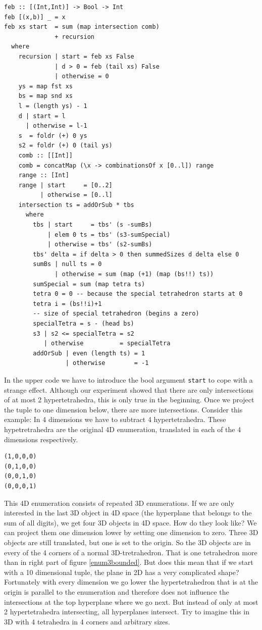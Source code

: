 \documentclass{tmr}
\begin{document}
\begin{Verbatim}
feb :: [(Int,Int)] -> Bool -> Int
feb [(x,b)] _ = x
feb xs start  = sum (map intersection comb)
              + recursion
  where
    recursion | start = feb xs False
              | d > 0 = feb (tail xs) False
              | otherwise = 0
    ys = map fst xs
    bs = map snd xs
    l = (length ys) - 1
    d | start = l
      | otherwise = l-1
    s  = foldr (+) 0 ys
    s2 = foldr (+) 0 (tail ys)
    comb :: [[Int]]
    comb = concatMap (\x -> combinationsOf x [0..l]) range
    range :: [Int]
    range | start     = [0..2]
          | otherwise = [0..l]
    intersection ts = addOrSub * tbs
      where
        tbs | start     = tbs' (s -sumBs)
            | elem 0 ts = tbs' (s3-sumSpecial)
            | otherwise = tbs' (s2-sumBs)
        tbs' delta = if delta > 0 then summedSizes d delta else 0
        sumBs | null ts = 0
              | otherwise = sum (map (+1) (map (bs!!) ts))
        sumSpecial = sum (map tetra ts)
        tetra 0 = 0 -- because the special tetrahedron starts at 0
        tetra i = (bs!!i)+1
        -- size of special tetrahedron (begins a zero)
        specialTetra = s - (head bs)
        s3 | s2 <= specialTetra = s2
           | otherwise          = specialTetra
        addOrSub | even (length ts) = 1
                 | otherwise        = -1
\end{Verbatim}

In the upper code we have to introduce the bool argument \verb|start| to cope with a strange effect.
Although our experiment showed that there are only intersections of at most 2 hypertetrahedra,
this is only true in the beginning. Once we project the tuple to one dimension below,
there are more intersections.
Consider this example: In 4 dimensions we have to subtract 4 hypertetrahedra.
These hypetretrahedra are the original 4D enumeration, translated in each of the
4 dimensions respectively. \eg
\begin{Verbatim}
(1,0,0,0)
(0,1,0,0)
(0,0,1,0)
(0,0,0,1)
\end{Verbatim}

This 4D enumeration consists of repeated 3D enumerations.
If we are only interested in the last 3D object in 4D space (the hyperplane that belongs 
to the sum of all digits), we get four 3D objects in 4D space. How do they look like? 
We can project them one dimension lower by setting one dimension to zero.
Three 3D objects are still translated, but one is set to the origin.
So the 3D objects are in every of the 4 corners of a normal 3D-tretrahedron.
That is one tetrahedron more than in right part of figure \ref{enum3bounded}.
But does this mean that if we start with a 10 dimensional tuple, the plane in 2D has a
very complicated shape? Fortunately with every dimension we go lower the hypertetrahedron 
that is at the origin is parallel to the enumeration and therefore does not influence 
the intersections at the top hyperplane where we go next. But instead of only at most 2 
hypertetrahedra intersecting, all hyperplanes intersect. Try to imagine this in 3D with 4 
tetrahedra in 4 corners and arbitrary sizes.
\end{document}
